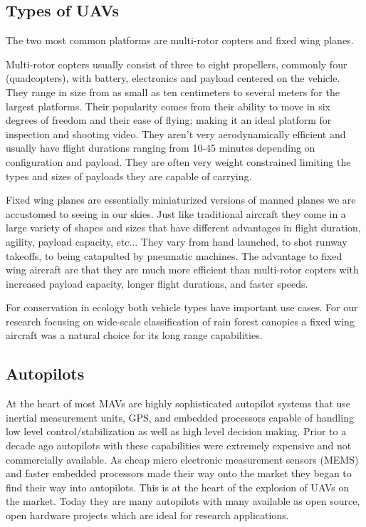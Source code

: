 \subsection{Types of UAVs}

The two most common platforms are multi-rotor copters and fixed wing planes.

Multi-rotor copters usually consist of three to eight propellers, commonly four (quadcopters), with battery, electronics and payload centered on the vehicle. They range in size from as small as ten centimeters to several meters for the largest platforms. Their popularity comes from their ability to move in six degrees of freedom and their ease of flying; making it an ideal platform for inspection and shooting video. They aren't very aerodynamically efficient and usually have flight durations ranging from 10-45 minutes depending on configuration and payload. They are often very weight constrained limiting the types and sizes of payloads they are capable of carrying.

Fixed wing planes are essentially miniaturized versions of manned planes we are accustomed to seeing in our skies. Just like traditional aircraft they come in a large variety of shapes and sizes that have different advantages in flight duration, agility, payload capacity, etc... They vary from hand launched, to shot runway takeoffs, to being catapulted by pneumatic machines. The advantage to fixed wing aircraft are that they are much more efficient than multi-rotor copters with increased payload capacity, longer flight durations, and faster speeds.

For conservation in ecology both vehicle types have important use cases. For our research focusing on wide-scale classification of rain forest canopies a fixed wing aircraft was a natural choice for its long range capabilities.

\subsection{Autopilots}

At the heart of most MAVs are highly sophisticated autopilot systems that use inertial measurement units, GPS, and embedded processors capable of handling low level control/stabilization as well as high level decision making. Prior to a decade ago autopilots with these capabilities were extremely expensive and not commercially available. As cheap micro electronic measurement sensors (MEMS) and faster embedded processors made their way onto the market they began to find their way into autopilots. This is at the heart of the explosion of UAVs on the market. Today they are many autopilots with many available as open source, open hardware projects which are ideal for research applications.

